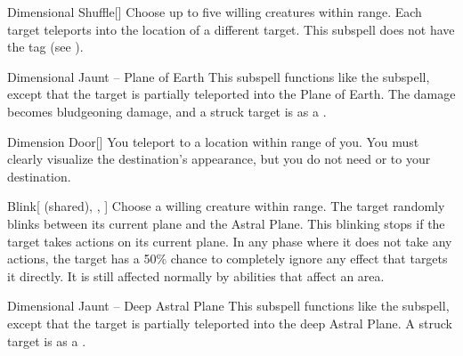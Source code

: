 \begin{ability}[\nth{2}]{Dimensional Shuffle}[]
Choose up to five willing creatures within \rngmed range.
Each target teleports into the location of a different target.
This subspell does not have the  tag (see ).
\end{ability}
\vspace{0.25em}


\begin{ability}[\nth{3}]{Dimensional Jaunt -- Plane of Earth}
This subspell functions like the  subspell, except that the target is partially teleported into the Plane of Earth.
The damage becomes bludgeoning damage, and a struck target is  as a .
\end{ability}
\vspace{0.25em}


\begin{ability}[\nth{4}]{Dimension Door}[]
You teleport to a location within \rngext range of you.
You must clearly visualize the destination's appearance, but you do not need  or  to your destination.
\end{ability}
\vspace{0.25em}


\begin{ability}[\nth{5}]{Blink}[ (shared), , ]
Choose a willing creature within \rngclose range.
The target randomly blinks between its current plane and the Astral Plane.
This blinking stops if the target takes actions on its current plane.
In any phase where it does not take any actions, the target has a 50\% chance to completely ignore any effect that targets it directly.
It is still affected normally by abilities that affect an area.
\end{ability}
\vspace{0.25em}


\begin{ability}[\nth{6}]{Dimensional Jaunt -- Deep Astral Plane}
This subspell functions like the  subspell, except that the target is partially teleported into the deep Astral Plane.
A struck target is  as a .
\end{ability}
\vspace{0.25em}


